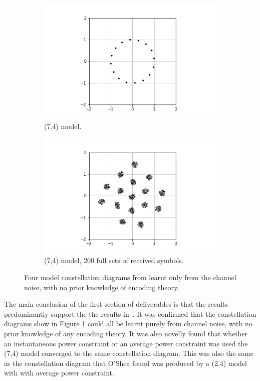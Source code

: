 \documentclass[12pt,onecolumn,letterpaper]{article}
\begin{document}
\begin{figure}[t!]
\begin{subfigure}[t]{0.24\textwidth}
       \includegraphics[width=\linewidth]{figures/leaky_relu_16_QAM_constellation_diagram.png}
       \caption{(7,4) model.}
   \end{subfigure}
   \hfill
   \begin{subfigure}[t]{0.24\textwidth}
       \centering
       \includegraphics[width=\linewidth]{figures/tSNE_7_4_constellation_diagram_with_noise_200.png}
       \caption{(7,4) model, 200 full sets of received symbols.}
   \end{subfigure}
   \caption{Four model constellation diagrams from learnt only from the channel noise, with no prior knowledge of encoding theory.}
   \label{fig:OSheaConcConstDiags}
\end{figure}

The main conclusion of the first section of deliverables is that the results predominantly support the the results in~\cite{oShea}. It was confirmed that the constellation diagrams show in Figure \ref{fig:OSheaConcConstDiags} could all be learnt purely from channel noise, with no prior knowledge of any encoding theory. It was also novelly found that whether an instantaneous power constraint or an average power constraint was used the (7,4) model converged to the same constellation diagram. This was also the same as the constellation diagram that O'Shea \etal found was produced by a (2,4) model with with average power constraint. 
\end{document}
